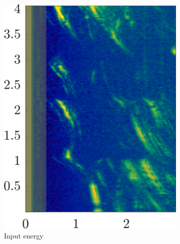 \begin{figure}[htbp]
    \centering
    \begin{subfigure}[t]{0.32\linewidth}
        \centering
        \includegraphics[width=\linewidth]{gfx/results/torturechamber_input.png}
        \caption{\small Input energy}
    \end{subfigure}%
    \hfill%
    \begin{subfigure}[t]{0.32\linewidth}  
        \centering 

\end{subfigure}
\end{figure}

